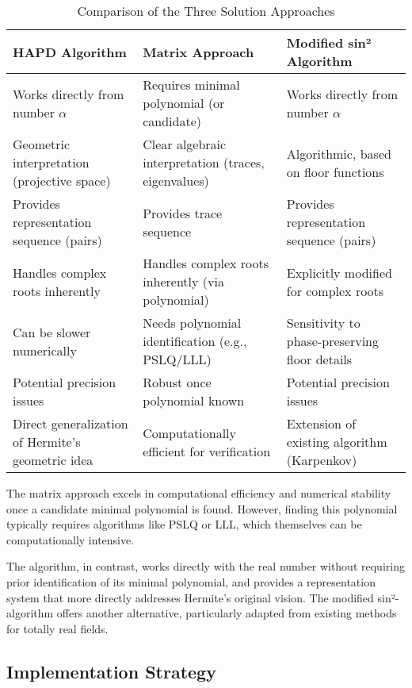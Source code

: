 \begin{table}[h]
\centering
\caption{Comparison of the Three Solution Approaches}
\label{tab:comparison}
\begin{tabular}{|p{}|p{}|p{}|}
\hline
\textbf{HAPD Algorithm} & \textbf{Matrix Approach} & \textbf{Modified sin² Algorithm} \\
\hline
Works directly from number $\alpha$ & Requires minimal polynomial (or candidate) & Works directly from number $\alpha$ \\
\hline
Geometric interpretation (projective space) & Clear algebraic interpretation (traces, eigenvalues) & Algorithmic, based on floor functions \\
\hline
Provides representation sequence (pairs) & Provides trace sequence & Provides representation sequence (pairs) \\
\hline
Handles complex roots inherently & Handles complex roots inherently (via polynomial) & Explicitly modified for complex roots \\
\hline
Can be slower numerically & Needs polynomial identification (e.g., PSLQ/LLL) & Sensitivity to phase-preserving floor details \\
\hline
Potential precision issues & Robust once polynomial known & Potential precision issues \\
\hline
Direct generalization of Hermite's geometric idea & Computationally efficient for verification & Extension of existing algorithm (Karpenkov) \\
\hline
\end{tabular}
\end{table}

The matrix approach excels in computational efficiency and numerical stability once a candidate minimal polynomial is found. However, finding this polynomial typically requires algorithms like PSLQ or LLL, which themselves can be computationally intensive.

The \HAPD{} algorithm, in contrast, works directly with the real number without requiring prior identification of its minimal polynomial, and provides a representation system that more directly addresses Hermite's original vision. The modified sin²-algorithm offers another alternative, particularly adapted from existing methods for totally real fields.

\subsection{Implementation Strategy}

